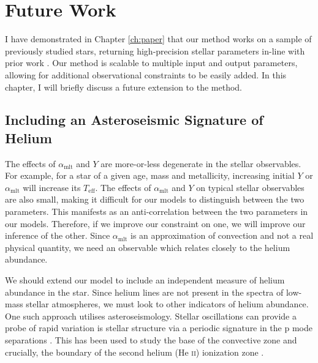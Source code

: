 \chapter{Future Work}\label{ch:future}

I have demonstrated in Chapter \ref{ch:paper} that our method works on a sample of previously studied stars, returning high-precision stellar parameters in-line with prior work \citep{Serenelli.Johnson.ea2017}. Our method is scalable to multiple input and output parameters, allowing for additional observational constraints to be easily added. In this chapter, I will briefly discuss a future extension to the method.

\section{Including an Asteroseismic Signature of Helium}

The effects of $\alpha_\mathrm{mlt}$ and $Y$ are more-or-less degenerate in the stellar observables. For example, for a star of a given age, mass and metallicity, increasing initial $Y$ or $\alpha_\mathrm{mlt}$ will increase its $T_\mathrm{eff}$. The effects of $\alpha_\mathrm{mlt}$ and $Y$ on typical stellar observables are also small, making it difficult for our models to distinguish between the two parameters. This manifests as an anti-correlation between the two parameters in our models. Therefore, if we improve our constraint on one, we will improve our inference of the other. Since $\alpha_\mathrm{mlt}$ is an approximation of convection and not a real physical quantity, we need an observable which relates closely to the helium abundance.

We should extend our model to include an independent measure of helium abundance in the star. Since helium lines are not present in the spectra of low-mass stellar atmospheres, we must look to other indicators of helium abundance. One such approach utilises asteroseismology. Stellar oscillations can provide a probe of rapid variation is stellar structure via a periodic signature in the p mode separations \citep[see e.g.][]{Broomhall.Miglio.ea2014}. This has been used to study the base of the convective zone \citep{Monteiro.Christensen-Dalsgaard.ea2000} and crucially, the boundary of the second helium (He \textsc{ii}) ionization zone \citep{Houdek.Gough2007}.

